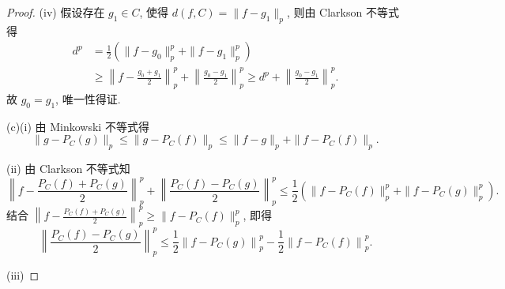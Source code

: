 \begin{proof}
     (iv) 假设存在 $g_1\in C$, 使得 $d(f,C)=\|f-g_1\|_p$, 则由 Clarkson 不等式得
     \begin{align*}
         d^p
         & =\frac{1}{2}\left(\|f-g_0\|_p^p+\|f-g_1\|_p^p\right) \\
         & \geq\left\|f-\frac{g_0+g_1}{2}\right\|_p^p+\left\|\frac{g_0-g_1}{2}\right\|_p^p\geq d^p+\left\|\frac{g_0-g_1}{2}\right\|_p^p.
     \end{align*}
     故 $g_0=g_1$, 唯一性得证.

     (c)(i) 由 Minkowski 不等式得
     \[\|g-P_C(g)\|_p\leq\|g-P_C(f)\|_p\leq\|f-g\|_p+\|f-P_C(f)\|_p.\]

     (ii) 由 Clarkson 不等式知
     \[\left\|f-\frac{P_C(f)+P_C(g)}{2}\right\|_p^p+\left\|\frac{P_C(f)-P_C(g)}{2}\right\|_p^p\leq\frac{1}{2}\left(\|f-P_C(f)\|_p^p+\|f-P_C(g)\|_p^p\right).\]
     结合 $\left\|f-\frac{P_C(f)+P_C(g)}{2}\right\|_p^p\geq \|f-P_C(f)\|_p^p$, 即得
     \[
         \left\|\frac{P_{C}(f)-P_{C}(g)}{2}\right\|_{p}^{p} \leq \frac{1}{2}\left\|f-P_{C}(g)\right\|_{p}^{p}-\frac{1}{2}\left\|f-P_{C}(f)\right\|_{p}^{p}.
     \]

     (iii) 
\end{proof}